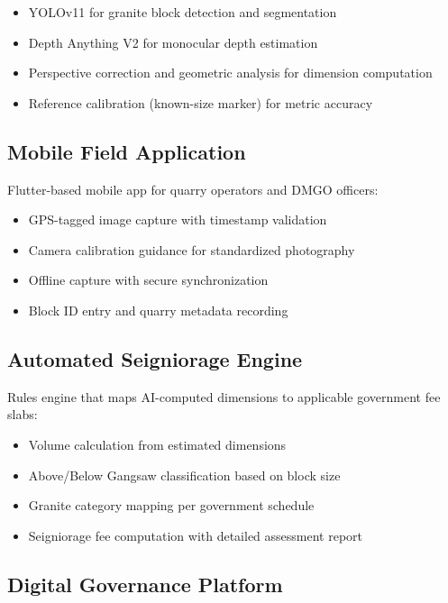 \documentclass[11pt,a4paper]{article}
\begin{document}
\begin{itemize}[leftmargin=1.5em, itemsep=3pt]
  \item YOLOv11 for granite block detection and segmentation
  \item Depth Anything V2 for monocular depth estimation
  \item Perspective correction and geometric analysis for dimension computation
  \item Reference calibration (known-size marker) for metric accuracy
\end{itemize}

\subsection{Mobile Field Application}

Flutter-based mobile app for quarry operators and DMGO officers:

\begin{itemize}[leftmargin=1.5em, itemsep=3pt]
  \item GPS-tagged image capture with timestamp validation
  \item Camera calibration guidance for standardized photography
  \item Offline capture with secure synchronization
  \item Block ID entry and quarry metadata recording
\end{itemize}

\subsection{Automated Seigniorage Engine}

Rules engine that maps AI-computed dimensions to applicable government fee slabs:

\begin{itemize}[leftmargin=1.5em, itemsep=3pt]
  \item Volume calculation from estimated dimensions
  \item Above/Below Gangsaw classification based on block size
  \item Granite category mapping per government schedule
  \item Seigniorage fee computation with detailed assessment report
\end{itemize}

\subsection{Digital Governance Platform}
\end{document}
